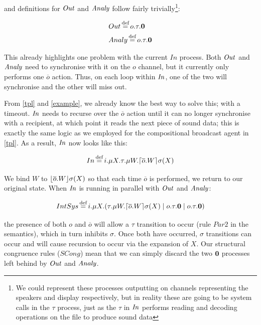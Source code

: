\noindent and definitions for $\mathit{Out}$ and $\mathit{Analy}$ follow fairly
trivially\footnote{We could represent these processes outputting on
  channels representing the speakers and display respectively, but in
  reality these are going to be system calls in the $\tau$ process,
  just as the $\tau$ in $\mathit{In}$ performs reading and decoding operations
  on the file to produce sound data}:

\begin{equation}
\begin{aligned}
  & Out \operatorname{\stackrel{\textrm{def}}{=}} o.\tau.\textbf{0} \\
  & Analy \operatorname{\stackrel{\textrm{def}}{=}} o.\tau.\textbf{0}
\end{aligned}
\end{equation}

This already highlights one problem with the current $In$ process.
Both $\mathit{Out}$ and $\mathit{Analy}$ need to synchronise with it on the $o$ channel,
but it currently only performs one $\overline{o}$ action.  Thus, on
each loop within $\mathit{In}$, one of the two will synchronise and the other
will miss out.

From \ref{tpl} and \ref{example}, we already know the best way to
solve this; with a timeout.  $\mathit{In}$ needs to recurse over the
$\overline{o}$ action until it can no longer synchronise with a
recipient, at which point it reads the next piece of sound data; this
is exactly the same logic as we employed for the compositional
broadcast agent in \ref{tpl}.  As a result, $\mathit{In}$ now looks like this:

\begin{equation}
  In \operatorname{\stackrel{\textrm{def}}{=}} i.\mu X.\tau.\mu W.\lceil{\overline{o}.W}\rceil {\sigma} ({X})
\end{equation}

\noindent We bind $W$ to $\lfloor{\overline{o}.W}\rfloor {\sigma} ({X})$ so that
each time $\overline{o}$ is performed, we return to our original state.
When $\mathit{In}$ is running in parallel with $\mathit{Out}$ and $\mathit{Analy}$:

\begin{equation}
  IntSys \operatorname{\stackrel{\textrm{def}}{=}} i.\mu X.(\tau.\mu W.\lceil{\overline{o}.W}\rceil {\sigma} ({X}) \;|\; o.\tau.\textbf{0} \;|\; o.\tau.\textbf{0})
\end{equation}

\noindent the presence of both $o$ and $\overline{o}$ will allow a
$\tau$ transition to occur (rule $Par2$ in the semantics), which in
turn inhibits $\sigma$.  Once both have occurred, $\sigma$ transitions
can occur and will cause recursion to occur via the expansion of $X$.
Our structural congruence rules ($SCong$) mean that we can simply
discard the two $\textbf{0}$ processes left behind by $\mathit{Out}$ and $\mathit{Analy}$.

